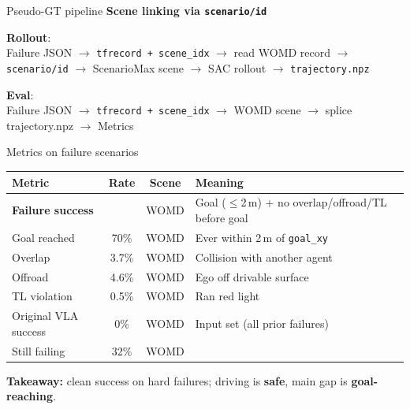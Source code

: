 \begin{frame}{Pseudo-GT pipeline}
  {\large\bfseries Scene linking via \texttt{scenario/id}}

  \vspace{0.8em}
  \textbf{Rollout}:\\[0.35em]
  Failure JSON $\rightarrow$ \texttt{tfrecord + scene\_idx}
  $\rightarrow$ read WOMD record $\rightarrow$ \texttt{scenario/id}
  $\rightarrow$ ScenarioMax scene $\rightarrow$ SAC rollout $\rightarrow$ \texttt{trajectory.npz}

  \vspace{0.9em}
  \textbf{Eval}:\\[0.35em]
  Failure JSON $\rightarrow$ \texttt{tfrecord + scene\_idx}
  $\rightarrow$ WOMD scene $\rightarrow$ splice trajectory.npz $\rightarrow$ Metrics
\end{frame}

\begin{frame}{Metrics on failure scenarios}
  \begin{table}
    \centering
    \small
    \begin{tabular}{@{}lccp{5.4cm}@{}}
      \toprule
      Metric & Rate & Scene & Meaning \\
      \midrule
      \textbf{Failure success} & \womdsucc{} & WOMD &
        Goal ($\leq$2\,m) + no overlap/offroad/TL before goal \\
      Goal reached & 70\% & WOMD & Ever within 2\,m of \texttt{goal\_xy} \\
      Overlap & 3.7\% & WOMD & Collision with another agent \\
      Offroad & 4.6\% & WOMD & Ego off drivable surface \\
      TL violation & 0.5\% & WOMD & Ran red light \\
      \midrule
      Original VLA success & 0\% & WOMD & Input set (all prior failures) \\
      Still failing & 32\% & WOMD & \\
      \bottomrule
    \end{tabular}
  \end{table}

  \vspace{0.3em}
  \textbf{Takeaway:} \womdsucc{} clean success on hard failures; driving is \textbf{safe}, main gap is \textbf{goal-reaching}.
\end{frame}

